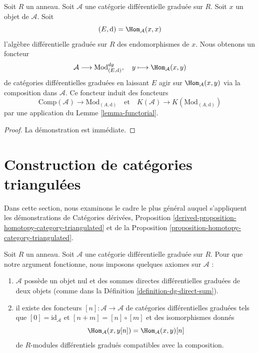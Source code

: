 \begin{lemma}
\label{lemma-construction}
Soit $R$ un anneau. Soit $\mathcal{A}$ une catégorie différentielle graduée sur
$R$. Soit $x$ un objet de $\mathcal{A}$. Soit
$$
(E, \text{d}) = \Hom_\mathcal{A}(x, x)
$$
l'algèbre différentielle graduée sur $R$ des endomorphismes de $x$. Nous
obtenons un foncteur
$$
\mathcal{A} \longrightarrow \text{Mod}^{dg}_{(E, \text{d})},\quad
y \longmapsto \Hom_\mathcal{A}(x, y)
$$
de catégories différentielles graduées en laissant $E$ agir sur
$\Hom_\mathcal{A}(x, y)$ via la composition dans $\mathcal{A}$. Ce foncteur induit
des foncteurs
$$
\text{Comp}(\mathcal{A}) \to \text{Mod}_{(A, \text{d})}
\quad\text{et}\quad
K(\mathcal{A}) \to K(\text{Mod}_{(A, \text{d})})
$$
par une application du Lemme \ref{lemma-functorial}.
\end{lemma}

\begin{proof}
La démonstration est immédiate.
\end{proof}









\section{Construction de catégories triangulées}
\label{section-review}

\noindent
Dans cette section, nous examinons le cadre le plus général auquel
s'appliquent les démonstrations de Catégories dérivées, Proposition
\ref{derived-proposition-homotopy-category-triangulated} et de la Proposition
\ref{proposition-homotopy-category-triangulated}.

\medskip\noindent
Soit $R$ un anneau. Soit $\mathcal{A}$ une catégorie différentielle graduée sur
$R$. Pour que notre argument fonctionne, nous imposons quelques axiomes sur
$\mathcal{A}$ :
\begin{enumerate}
\item[(A)] $\mathcal{A}$ possède un objet nul et des sommes directes
différentielles graduées de deux objets (comme dans la Définition
\ref{definition-dg-direct-sum}).
\item[(B)] il existe des foncteurs $[n] : \mathcal{A} \longrightarrow \mathcal{A}$
de catégories différentielles graduées tels que $[0] = \text{id}_\mathcal{A}$ et
$[n + m] = [n] \circ [m]$ et des isomorphismes donnés
$$
\Hom_\mathcal{A}(x, y[n]) = \Hom_\mathcal{A}(x, y)[n]
$$
de $R$-modules différentiels gradués compatibles avec la composition.
\end{enumerate}

